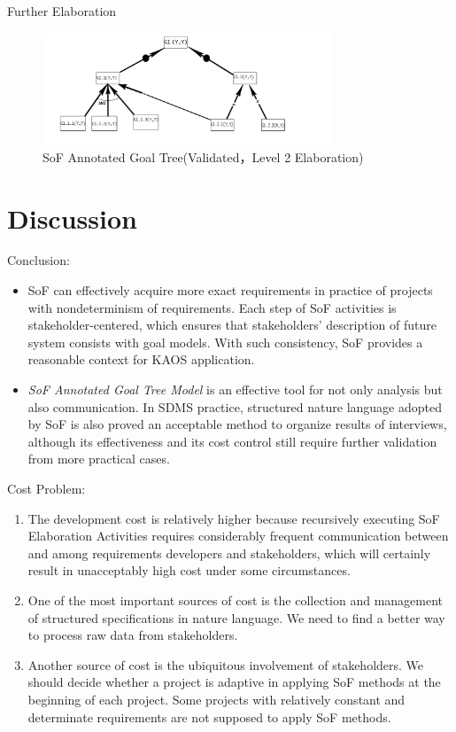 ﻿\documentclass{beamer}
\begin{document}
\begin{frame} {Further Elaboration}
  \begin{figure}
    \includegraphics[width=3.4in]{img/5.PNG}
    \caption{SoF Annotated Goal Tree(Validated，Level 2 Elaboration)}
  \end{figure}
\end{frame}    

\section{Discussion}
\begin{frame}{Conclusion:} %
  \small{
  \begin{itemize}
  \item
    SoF can effectively acquire more exact requirements in practice of projects with nondeterminism of requirements. Each step of SoF activities is stakeholder-centered, which ensures that stakeholders' description of future system consists with goal models. With such consistency, SoF provides a reasonable context for KAOS application.\pause
  \item
    \emph{SoF Annotated Goal Tree Model} is an effective tool for not only analysis but also communication. In SDMS practice, structured nature language adopted by SoF is also proved an acceptable method to organize results of interviews, although its effectiveness and its cost control still require further validation from more practical cases.\pause
  \end{itemize}
  }
\end{frame}  

\begin{frame}{Cost Problem:}
  \small{
  \begin{enumerate}
  \item The development cost is relatively higher because recursively executing SoF Elaboration Activities requires considerably frequent communication between and among requirements developers and stakeholders, which will certainly result in unacceptably high cost under some circumstances.\pause
  \item
    One of the most important sources of cost is the collection and management of structured specifications in nature language. We need to find a better way to process raw data from stakeholders.\pause
  \item 
    Another source of cost is the ubiquitous involvement of stakeholders. We should decide whether a project is adaptive in applying SoF methods at the beginning of each project. Some projects with relatively constant and determinate requirements are not supposed to apply SoF methods.\pause
  \end{enumerate}
  }
\end{frame}
\end{document}
